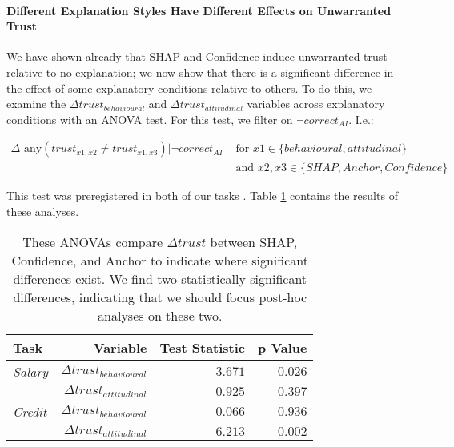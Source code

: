 \paragraph{Different Explanation Styles Have Different Effects on Unwarranted Trust}
We have shown already that SHAP and Confidence induce unwarranted trust relative to no explanation; we now show that there is a significant difference in the effect of some explanatory conditions relative to others. To do this, we examine the $\Delta trust_{behavioural}$ and $\Delta trust_{attitudinal}$ variables across explanatory conditions with an ANOVA test. For this test, we filter on $\neg correct_{AI}$. I.e.:

\begin{equation}
    \begin{split}
        \Delta \text{ any}(trust_{x1,x2} \neq trust_{x1,x3}) | \neg correct_{AI} & \text{ for } x1 \in \{behavioural, attitudinal\} \\
        & \text{ and } x2,x3 \in \{SHAP, Anchor, Confidence\}
    \end{split}
\end{equation}

\noindent This test was preregistered in both of our tasks \cite{natarajan_binns_2022}. Table \ref{tab:delta-trust-anova} contains the results of these analyses.

\begin{table}[htb]
    \centering
    \caption{These ANOVAs compare $\Delta trust$ between SHAP, Confidence, and Anchor to indicate where significant differences exist. We find two statistically significant differences, indicating that we should focus post-hoc analyses on these two.}
    \label{tab:delta-trust-anova}
    \begin{tabular}{lrrr}
        \toprule
        Task & Variable & Test Statistic & p Value \\
        \midrule
        \emph{Salary} & $\Delta trust_{behavioural}$ & $\mathbf{3.671}$ & $\mathbf{0.026}$ \\
        & $\Delta trust_{attitudinal}$ & $0.925$ & $0.397$ \\
        \midrule
        \emph{Credit} & $\Delta trust_{behavioural}$ & $0.066$ & $0.936$ \\
        & $\Delta trust_{attitudinal}$ & $\mathbf{6.213}$ & $\mathbf{0.002}$ \\
        \bottomrule
    \end{tabular}
\end{table}


